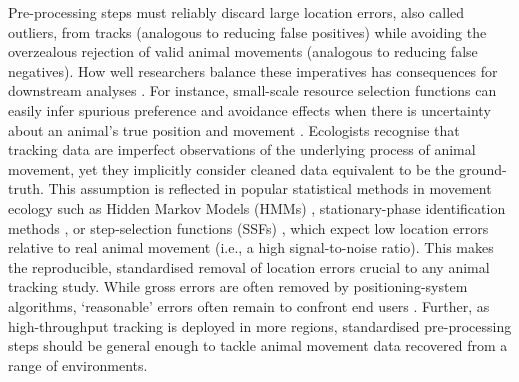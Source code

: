 \documentclass[10pt,paper=a4,headings=standardclasses
]{scrartcl}
\begin{document}
Pre-processing steps must reliably discard large location errors, also called outliers, from tracks (analogous to reducing false positives) while avoiding the overzealous rejection of valid animal movements (analogous to reducing false negatives).
How well researchers balance these imperatives has consequences for downstream analyses \citep{stine2001}.
For instance, small-scale resource selection functions can easily infer spurious preference and avoidance effects when there is uncertainty about an animal's true position and movement \citep{visscher2006}.
Ecologists recognise that tracking data are imperfect observations of the underlying process of animal movement, yet they implicitly consider cleaned data equivalent to be the ground-truth.
This assumption is reflected in popular statistical methods in movement ecology such as Hidden Markov Models (HMMs) \citep{langrock2012}, stationary-phase identification methods \citep{patin2020a}, or step-selection functions (SSFs) \citep{barnett2008, signer2017, avgar2016}, which expect low location errors relative to real animal movement (i.e., a high signal-to-noise ratio).
This makes the reproducible, standardised removal of location errors crucial to any animal tracking study.
While gross errors are often removed by positioning-system algorithms, ‘reasonable’ errors often remain to confront end users \citep{fischler1981, weiser2016, ranacher2016}.
Further, as high-throughput tracking is deployed in more regions, standardised pre-processing steps should be general enough to tackle animal movement data recovered from a range of environments.
\end{document}
